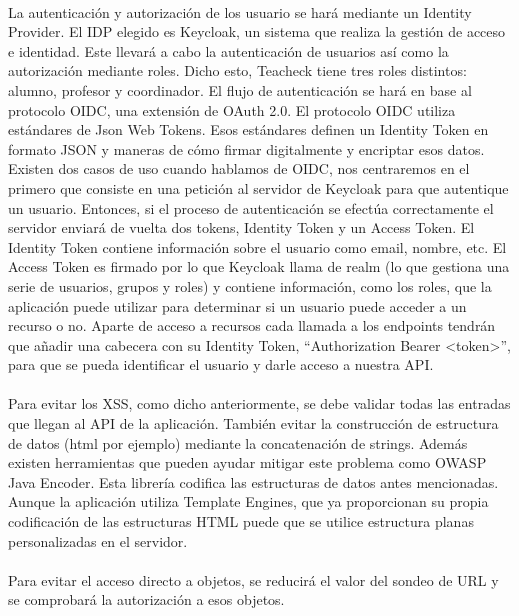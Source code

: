 \paragraph{}
La autenticación y autorización de los usuario se hará mediante un
Identity Provider. El IDP elegido es Keycloak, un sistema que realiza
la gestión de acceso e identidad. Este llevará a cabo la autenticación
de usuarios así como la autorización mediante roles. Dicho esto,
Teacheck tiene tres roles distintos: alumno, profesor y
coordinador. El flujo de autenticación se hará en base al protocolo
OIDC, una extensión de OAuth 2.0. El protocolo OIDC utiliza estándares
de Json Web Tokens. Esos estándares definen un Identity Token en
formato JSON y maneras de cómo firmar digitalmente y encriptar esos
datos. Existen dos casos de uso cuando hablamos de OIDC, nos
centraremos en el primero que consiste en una petición al servidor de
Keycloak para que autentique un usuario. Entonces, si el proceso de
autenticación se efectúa correctamente el servidor enviará de vuelta
dos tokens, Identity Token y un Access Token. El Identity Token
contiene información sobre el usuario como email, nombre, etc. El
Access Token es firmado por lo que Keycloak llama de realm (lo que
gestiona una serie de usuarios, grupos y roles) y contiene
información, como los roles, que la aplicación puede utilizar para
determinar si un usuario puede acceder a un recurso o no. Aparte de
acceso a recursos cada llamada a los endpoints tendrán que añadir una
cabecera con su Identity Token, “Authorization Bearer <token>”, para
que se pueda identificar el usuario y darle acceso a nuestra API.
\paragraph{}
Para evitar los XSS, como dicho anteriormente, se debe validar todas
las entradas que llegan al API de la aplicación. También evitar la
construcción de estructura de datos (html por ejemplo) mediante la
concatenación de strings. Además existen herramientas que pueden
ayudar mitigar este problema como OWASP Java Encoder. Esta librería
codifica las estructuras de datos antes mencionadas. Aunque la
aplicación utiliza Template Engines, que ya proporcionan su propia
codificación de las estructuras HTML puede que se utilice estructura
planas personalizadas en el servidor.
\paragraph{}
Para evitar el acceso directo a objetos, se reducirá el valor del
sondeo de URL y se comprobará la autorización a esos objetos.
